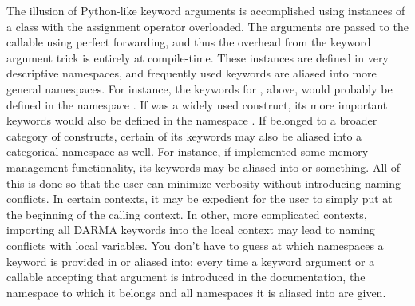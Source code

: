The illusion of Python-like keyword arguments is accomplished using  instances
of a class with the assignment operator overloaded.  The arguments are passed to the 
callable using perfect forwarding, and thus the overhead from the keyword argument 
trick is entirely at compile-time.  These instances are defined in very descriptive
namespaces, and frequently used keywords are aliased into more general namespaces.  For
instance, the keywords for , above, would probably be defined in the 
namespace .  If  was a 
widely used construct, its more important keywords would also be defined in the namespace
.  If  belonged to a broader category of 
constructs, certain of its keywords may also be aliased into a categorical namespace
as well.  For instance, if  implemented some memory management functionality,
its keywords may be aliased into  or 
something.  All of this is done so that the user can minimize verbosity without introducing
naming conflicts.  In certain contexts, it may be expedient for the user to simply
put  at the beginning of the calling context.  In other,
more complicated contexts, importing all DARMA keywords into the local context may
lead to naming conflicts with local variables.  You don't have to guess at which namespaces
a keyword is provided in or aliased into; every time a keyword argument or a callable
accepting that argument is introduced in the documentation, the namespace to which 
it belongs and all namespaces it is aliased into are given.



